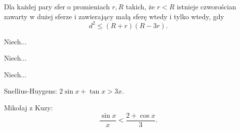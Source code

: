 \begin{proposition}
%
	Dla każdej pary sfer o promieniach $r, R$ takich, że $r < R$ istnieje czworościan zawarty w dużej sferze i zawierający małą sferę wtedy i tylko wtedy, gdy
	\begin{equation}d^2 \le (R+r)(R - 3r).\end{equation}
\end{proposition}

\begin{proposition}
	Niech...
\end{proposition}

\begin{proposition}
	Niech...
\end{proposition}

\begin{proposition}
	Niech...
\end{proposition}

Snellius-Huygens: $2 \sin x + \tan x > 3x$.



Mikołaj z Kuzy:
\begin{equation}
	\frac{\sin x}{x} < \frac{2 + \cos x}{3}.
\end{equation}


